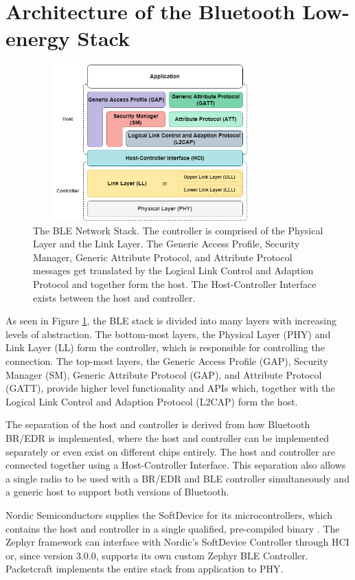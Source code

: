 \section{Architecture of the Bluetooth Low-energy Stack}
\begin{figure}[]
    \centering
    \includegraphics[width=0.8\textwidth,height=6cm,keepaspectratio=true]{images/ble_stack/ble_stack.drawio.png}
    \caption{
        The BLE Network Stack. The controller is comprised of the Physical Layer and the Link Layer. The Generic Access Profile, Security Manager, Generic Attribute Protocol, and Attribute Protocol messages get translated by the Logical Link Control and Adaption Protocol and together form the host. The Host-Controller Interface exists between the host and controller.
    }
    \label{fig:ble_stack}
\end{figure}

As seen in Figure \ref{fig:ble_stack}, the BLE stack is divided into many layers with increasing levels of abstraction. The bottom-most layers, the Physical Layer (PHY) and Link Layer (LL) form the controller, which is responsible for controlling the connection. The top-most layers, the Generic Access Profile (GAP), Security Manager (SM), Generic Attribute Protocol (GAP), and Attribute Protocol (GATT), provide higher level functionality and APIs which, together with the Logical Link Control and Adaption Protocol (L2CAP) form the host.

The separation of the host and controller is derived from how Bluetooth BR/EDR is implemented, where the host and controller can be implemented separately or even exist on different chips entirely. The host and controller are connected together using a Host-Controller Interface. This separation also allows a single radio to be used with a BR/EDR and BLE controller simultaneously and a generic host to support both versions of Bluetooth.

Nordic Semiconductors supplies the SoftDevice for its microcontrollers, which contains the host and controller in a single qualified, pre-compiled binary \cite{nordic_softdevices}. The Zephyr framework can interface with Nordic's SoftDevice Controller through HCI or, since version 3.0.0, supports its own custom Zephyr BLE Controller. Packetcraft implements the entire stack from application to PHY.

